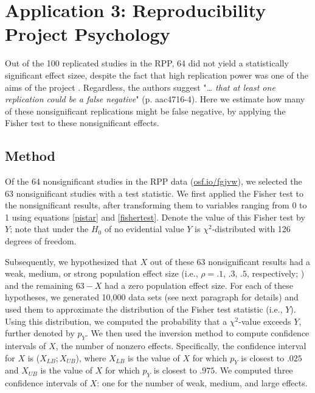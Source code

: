 \documentclass{article}
\begin{document}
\section*{Application 3: Reproducibility Project Psychology}

Out of the 100 replicated studies in the RPP, 64 did not yield a statistically significant effect sizee, despite the fact that high replication power was one of the aims of the project \cite{Open_Science_Collaboration2015-zs}. Regardless, the authors suggest "\textit{… that at least one replication could be a false negative}" (p. aac4716-4). Here we estimate how many of these nonsignificant replications might be false negative, by applying the Fisher test to these nonsignificant effects.

\subsection*{Method}

Of the 64 nonsignificant studies in the RPP data (\url{osf.io/fgjvw}), we selected the 63 nonsignificant studies with a test statistic. We first applied the Fisher test to the nonsignificant results, after transforming them to variables ranging from 0 to 1 using equations \ref{pistar} and \ref{fishertest}. Denote the value of this Fisher test by $Y$; note that under the $H_0$ of no evidential value $Y$ is $\chi^2$-distributed with 126 degrees of freedom.

Subsequently, we hypothesized that $X$ out of these 63 nonsignificant results had a weak, medium, or strong population effect size (i.e., $\rho=.1$, $.3$, $.5$, respectively; \cite{Cohen1988-wg}) and the remaining $63-X$ had a zero population effect size. For each of these hypotheses, we generated 10,000 data sets (see next paragraph for details) and used them to approximate the distribution of the Fisher test statistic (i.e., $Y$). Using this distribution, we computed the probability that a $\chi^2$-value exceeds $Y$, further denoted by $p_Y$. We then used the inversion method \cite{Casella2002-cy} to compute confidence intervals of $X$, the number of nonzero effects. Specifically, the confidence interval for $X$ is ($X_{LB};X_{UB}$), where $X_{LB}$ is the value of $X$ for which $p_Y$ is closest to $.025$ and $X_{UB}$ is the value of $X$ for which $p_Y$ is closest to $.975$. We computed three confidence intervals of $X$: one for the number of weak, medium, and large effects.
\end{document}
